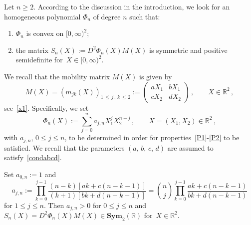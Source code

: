 \documentclass[AHL,Unicode,longabstracts,published]{cedram}
\newcommand{\bbR}{\mathbb{R}}
\newcommand{\bSym}{\mathbf{Sym}}
\newcommand*{\Penumi}{\renewcommand*{\theenumi}{P\arabic{enumi}}}
\begin{document}
Let $n\ge 2$. According to the discussion in the introduction, we look for an homogeneous polynomial $\Phi_n$ of degree $n$ such that:
\begin{enumerate}\Penumi
\item\label{P1} $\Phi_n$ is convex on $[0,\infty)^2$;
\item\label{P2} the matrix $S_n(X) := D^2\Phi_n(X) M(X)$ is symmetric and positive semidefinite for~${X\in [0,\infty)^2}$.
\end{enumerate}
We recall that the mobility matrix $M(X)$ is given by
\begin{equation*}
M(X) = \left(m_{jk}(X)\right)_{1\,\le\,j\,,\,k\,\le\,2} :=
\begin{pmatrix}
a X_1 & b X_1 \\
c X_2 & d X_2
\end{pmatrix}\,, \qquad X\in\bbR^2\,,
\end{equation*}
see~\eqref{x1}. Specifically, we set
\begin{equation}\label{Polen}
\Phi_n(X) := \sum_{j=0}^n a_{j,n} X_1^j X_2^{n-j}\,, \qquad X=(X_1,X_2)\in \bbR^2\,, 
\end{equation}
with $a_{j,n}$, $0\leq j\leq n$, to be determined in order for properties~\eqref{P1}-\eqref{P2} to be satisfied. We recall that the parameters $(a,\, b,\, c,\, d)$ are assumed to satisfy~\eqref{condabcd}.


\begin{lemm}\label{lem.p1}
Set $a_{0,n}:=1$ and
\begin{equation}\label{ajn}
a_{j,n}:= \prod_{k=0}^{j-1}\frac{(n-k)[ak+c(n-k-1)]}{(k+1)[bk+d(n-k-1)]} = \binom{n}{j} \prod_{k=0}^{j-1}\frac{ak+c(n-k-1)}{bk+d(n-k-1)}
\end{equation}
for $1\leq j\leq n$. Then $a_{j,n}>0$ for $0\le j \le n$ and $S_n(X) = D^2\Phi_n(X) M(X)\in {\bSym_2(\bbR)}$ for~$X\in\bbR^2$.
\end{lemm}
\end{document}
